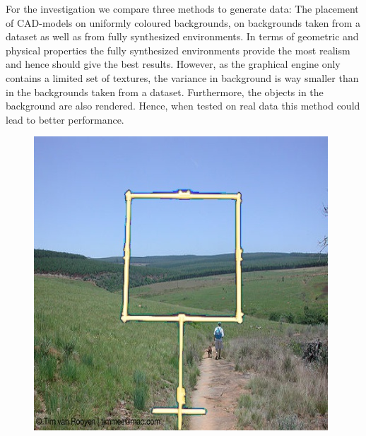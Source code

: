 For the investigation we compare three methods to generate data: The placement of \ac{CAD}-models on uniformly coloured backgrounds, on backgrounds taken from a dataset as well as from fully synthesized environments. In terms of geometric and physical properties the fully synthesized environments provide the most realism and hence should give the best results. However, as the graphical engine only contains a limited set of textures, the variance in background is way smaller than in the backgrounds taken from a dataset. Furthermore, the objects in the background are also rendered. Hence, when tested on real data this method could lead to better performance.


\begin{figure}[hbtp]
	\centering
	\begin{minipage}{0.3\textwidth}
		\includegraphics[width=\textwidth]{fig/voc}
	\end{minipage}
	\begin{minipage}{0.3\textwidth}

\end{minipage}
\end{figure}
